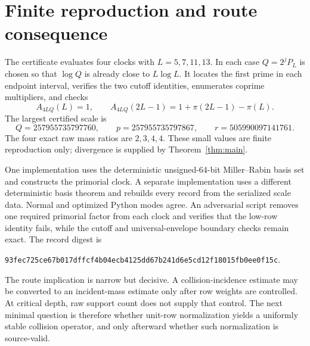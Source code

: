 \section{Finite reproduction and route consequence}

The certificate evaluates four clocks with $L=5,7,11,13$.  In each case
$Q=2^jP_L$ is chosen so that $\log Q$ is already close to $L\log L$.  It locates the
first prime in each endpoint interval, verifies the two cutoff identities, enumerates
coprime multipliers, and checks
\[
 A_{4LQ}(L)=1,
 \qquad
 A_{4LQ}(2L-1)=1+\pi(2L-1)-\pi(L).
\]
The largest certified scale is
\[
 Q=257955735797760,\qquad
 p=257955735797867,\qquad
 r=505990097141761.
\]
The four exact raw mass ratios are
$2,3,4,4$.  These small values are finite reproduction only; divergence is supplied
by Theorem~\ref{thm:main}.

One implementation uses the deterministic unsigned-64-bit Miller--Rabin basis set and
constructs the primorial clock.  A separate implementation uses a different
deterministic basis theorem and rebuilds every record from the serialized scale data.
Normal and optimized Python modes agree.  An adversarial script removes one required
primorial factor from each clock and verifies that the low-row identity fails, while
the cutoff and universal-envelope boundary checks remain exact.  The record digest is
\begin{center}
\texttt{93fec725ce67b017dffcf4b04ecb4125dd67b241d6e5cd12f18015fb0ee0f15c}.
\end{center}

The route implication is narrow but decisive.  A collision-incidence estimate may be
converted to an incident-mass estimate only after row weights are controlled.  At
critical depth, raw support count does not supply that control.  The next minimal
question is therefore whether unit-row normalization yields a uniformly stable
collision operator, and only afterward whether such normalization is source-valid.
